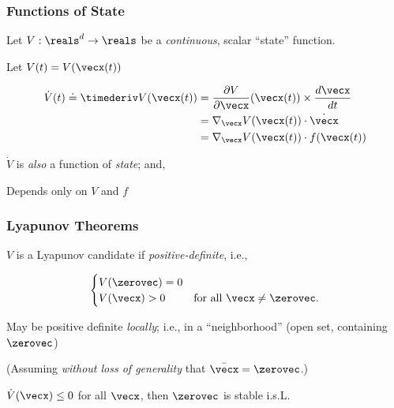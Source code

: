 \documentclass[12pt]{beamer}
\begin{document}
\begin{frame}
\frametitle{Functions of State}

\begin{itemize}
\vitem
Let $V : \reals^d \to \reals$ be a \emph{continuous}, scalar ``state'' function.

\vitem
Let $V(t) = V(\vecx(t))$

\vitem
\[
\begin{aligned}
\dot V(t) \doteq
\timederiv V(\vecx(t))
	&= \frac{\partial V}{\partial \vecx} (\vecx(t)) \times \frac{d\vecx}{dt}	\\
	&= \nabla_\vecx V(\vecx(t)) \cdot \dot\vecx	\\
	&= \nabla_\vecx V(\vecx(t)) \cdot f(\vecx(t))	\\
\end{aligned}
\]

\vitem $\dot V$ is \emph{also} a function of \emph{state}; and,

\vitem Depends only on $V$ and $f$

\end{itemize}
\vfill\null
\end{frame}






\begin{frame}
\frametitle{Lyapunov Theorems}

\begin{itemize}


\vitem
$V$ is a Lyapunov candidate if \emph{positive-definite}, i.e.,

\[
\begin{cases}
	V(\zerovec) = 0 &\\
	V(\vecx) > 0 & \text{for all $\vecx \neq \zerovec$}.
\end{cases}
\]

\vitem
May be positive definite \emph{locally}; i.e., in a ``neighborhood''
(open set, containing $\zerovec$)

\vitem
(Assuming \emph{without loss of generality} that $\bar{\vecx} = \zerovec$.)

\vitem $\dot V(\vecx) \leq 0$ for all $\vecx$, then $\zerovec$ is stable i.s.L.

\end{itemize}
\vfill\null
\end{frame}
\end{document}
